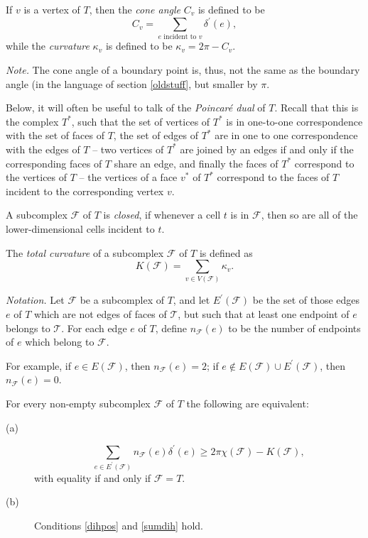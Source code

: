 \documentclass{acmart}
\newcommand{\thm}[2]{\begin{#1} #2 \end{#1}}
\begin{document}
If $v$ is a vertex of $T$, then the \emph{cone angle} $C_v$
is defined to be $$C_v = \sum_{\mbox{$e$ incident to $v$}}
\delta^\prime(e),$$ while the \emph{curvature} $\kappa_v$ is defined
to be $\kappa_v = 2\pi - C_v.$ 

\medskip\noindent
\textit{Note.} The cone angle of a boundary point is, thus, not the
same as the boundary angle (in the language of section \ref{oldstuff},
but smaller by $\pi$.

Below, it will often be useful to talk of the \emph{Poincar\'e dual} of $T$. Recall that this
is the complex $T^*$, such that the set of vertices of $T^*$ is in one-to-one
correspondence with the set of faces of $T$, the set of edges of $T^*$ are in
one to one correspondence with the edges of $T$ -- two vertices of
$T^*$ are joined by an edges if and only if the corresponding faces of $T$ share
an edge, and finally the faces of $T^*$ correspond to the vertices of $T$ --
the vertices of a face $v^*$ of $T^*$ correspond to the faces of $T$ incident
to the corresponding vertex $v$. 

\thm{definition}
{
A subcomplex $\mathcal{F}$ of $T$ is \emph{closed}, 
if whenever a cell $t$ is in $\mathcal{F}$, then so are all of the
lower-dimensional cells incident to $t$.
}

\thm{definition}
{
The \emph{total curvature} of a subcomplex $\mathcal{F}$ of $T$ is
defined as
$$K(\mathcal{F}) = \sum_{v\in V(\mathcal{F})} \kappa_v.$$
}

\textit{Notation.}
Let $\mathcal{F}$ be a subcomplex of $T$, and let
$E^\prime(\mathcal{F})$ be the set of those edges $e$ of $T$ which are
not edges of faces of $\mathcal{T}$, but such that at least one
endpoint of $e$ belongs to $\mathcal{T}$. For each edge $e$ of $T$,
define $n_{\mathcal{F}}(e)$ to be the number of endpoints of $e$ which
belong to $\mathcal{F}$.

For example, if $e\in E(\mathcal{F})$, then $n_{\mathcal{F}}(e) = 2$;
if $e \notin E(\mathcal{F}) \cup E^\prime(\mathcal{F})$, then
$n_{\mathcal{F}}(e) = 0$.

\thm{theorem}
{
\label{kappaineq}
For every non-empty subcomplex $\mathcal{F}$ of $T$
the following are equivalent:

\begin{description}

\item[(a)]
$$
\sum_{e\in E^\prime(\mathcal{F})} n_{\mathcal{F}}(e)
\delta^\prime(e)\geq  2\pi \chi (\mathcal{F})- K(\mathcal{F}), 
$$
with equality if and only if $\mathcal{F} = T.$

\item[(b)] Conditions \ref{dihpos} and \ref{sumdih} hold.
\end{description}
}
\end{document}
